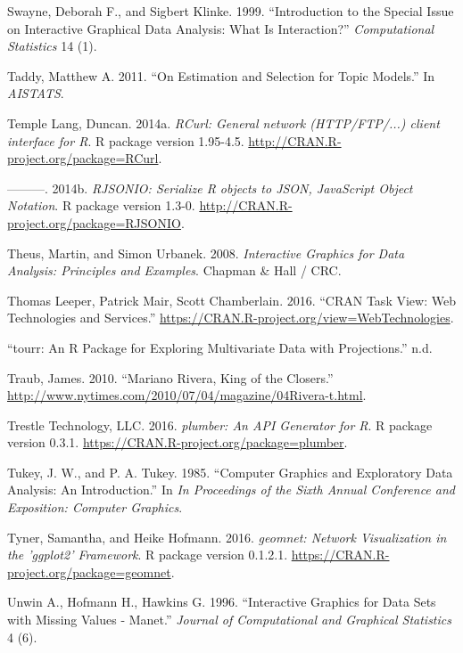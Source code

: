 \documentclass[12pt,]{isuthesis}
\begin{document}
\hypertarget{ref-swayne-klinke}{}
Swayne, Deborah F., and Sigbert Klinke. 1999. ``Introduction to the
Special Issue on Interactive Graphical Data Analysis: What Is
Interaction?'' \emph{Computational Statistics} 14 (1).

\hypertarget{ref-Taddy}{}
Taddy, Matthew A. 2011. ``On Estimation and Selection for Topic
Models.'' In \emph{AISTATS}.

\hypertarget{ref-RCurl}{}
Temple Lang, Duncan. 2014a. \emph{RCurl: General network (HTTP/FTP/...)
client interface for R}. R package version 1.95-4.5.
\url{http://CRAN.R-project.org/package=RCurl}.

\hypertarget{ref-RJSONIO}{}
---------. 2014b. \emph{RJSONIO: Serialize R objects to JSON, JavaScript
Object Notation}. R package version 1.3-0.
\url{http://CRAN.R-project.org/package=RJSONIO}.

\hypertarget{ref-mondrianbook}{}
Theus, Martin, and Simon Urbanek. 2008. \emph{Interactive Graphics for
Data Analysis: Principles and Examples}. Chapman \& Hall / CRC.

\hypertarget{ref-WebServices}{}
Thomas Leeper, Patrick Mair, Scott Chamberlain. 2016. ``CRAN Task View:
Web Technologies and Services.''
\url{https://CRAN.R-project.org/view=WebTechnologies}.

\hypertarget{ref-tourr}{}
``tourr: An R Package for Exploring Multivariate Data with
Projections.'' n.d.

\hypertarget{ref-NYT}{}
Traub, James. 2010. ``Mariano Rivera, King of the Closers.''
\url{http://www.nytimes.com/2010/07/04/magazine/04Rivera-t.html}.

\hypertarget{ref-plumber}{}
Trestle Technology, LLC. 2016. \emph{plumber: An API Generator for R}. R
package version 0.3.1. \url{https://CRAN.R-project.org/package=plumber}.

\hypertarget{ref-scagnostics-tukey}{}
Tukey, J. W., and P. A. Tukey. 1985. ``Computer Graphics and Exploratory
Data Analysis: An Introduction.'' In \emph{In Proceedings of the Sixth
Annual Conference and Exposition: Computer Graphics}.

\hypertarget{ref-geomnet}{}
Tyner, Samantha, and Heike Hofmann. 2016. \emph{geomnet: Network
Visualization in the 'ggplot2' Framework}. R package version 0.1.2.1.
\url{https://CRAN.R-project.org/package=geomnet}.

\hypertarget{ref-MANET}{}
Unwin A., Hofmann H., Hawkins G. 1996. ``Interactive Graphics for Data
Sets with Missing Values - Manet.'' \emph{Journal of Computational and
Graphical Statistics} 4 (6).
\end{document}
